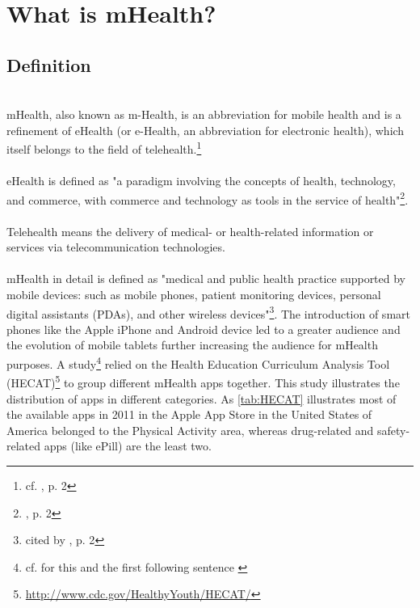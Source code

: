 \section{What is mHealth?}
\subsection{Definition}
\\
mHealth, also known as m-Health, is an abbreviation for mobile health and is a refinement of eHealth (or e-Health, an abbreviation for electronic health), which itself belongs to the field of telehealth.\footnote{cf. \cite{MartinezPerez.2013}, p. 2}
\\
\\
eHealth is defined as "a paradigm involving the concepts of health, technology, and commerce, with commerce and technology as tools in the service of health"\footnote{\cite{MartinezPerez.2013}, p. 2}.
\\
\\
Telehealth means the delivery of medical- or health-related information or services via telecommunication technologies.
\\
\\
mHealth in detail is defined as "medical and public health practice supported by mobile devices: such as mobile phones, patient monitoring devices, personal digital assistants (PDAs), and other wireless devices"\footnote{\cite{WorldHealthOrganization.2011} cited by \cite{MartinezPerez.2013}, p. 2}. The introduction of smart phones like the Apple iPhone and Android device led to a greater audience and the evolution of mobile tablets further increasing the audience for mHealth purposes. A study\footnote{cf. for this and the first following sentence \cite{West.2012}} relied on the Health Education Curriculum Analysis Tool (HECAT)\footnote{\url{http://www.cdc.gov/HealthyYouth/HECAT/}} to group different mHealth apps together. This study illustrates the distribution of apps in different categories. As \ref{tab:HECAT} illustrates most of the available apps in 2011 in the Apple App Store in the United States of America belonged to the Physical Activity area, whereas drug-related and safety-related apps (like ePill) are the least two. 
